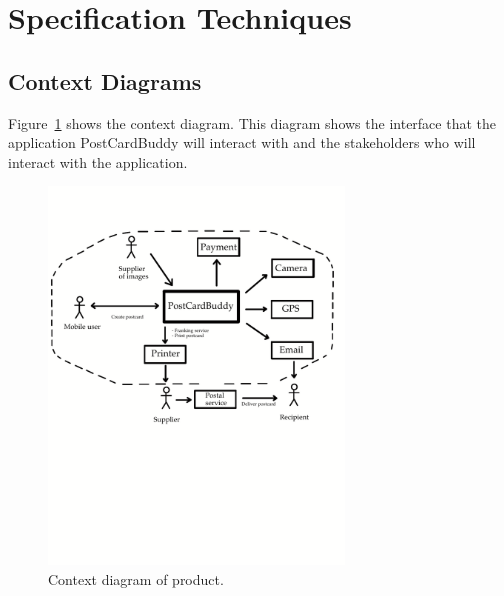 \documentclass[10pt,a4paper]{article}
\begin{document}
\section{Specification Techniques}
\subsection{Context Diagrams}
Figure~\ref{fig:context} shows the context diagram. This diagram shows the interface that the application PostCardBuddy will interact with and the stakeholders who will interact with the application.

\begin{figure}[h!]
\centering
\includegraphics[width=0.7\textwidth]{ContextDiagram2.pdf}
\caption{Context diagram of product.}
\label{fig:context}
\end{figure}
\end{document}
